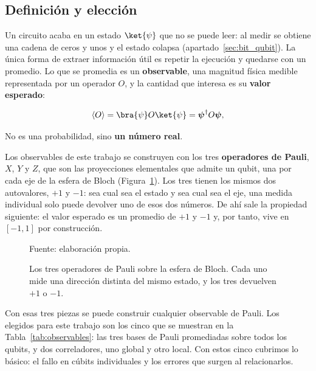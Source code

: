 \subsection{Definición y elección}
\label{sec:cinco_observables}

Un circuito acaba en un estado $\ket{\psi}$ que no se puede leer: al medir se obtiene una
cadena de ceros y unos y el estado colapsa (apartado~\ref{sec:bit_qubit}). La única forma de
extraer información útil es repetir la ejecución y quedarse con un promedio. Lo que se
promedia es un \textbf{observable}, una magnitud física medible representada por un operador
$O$, y la cantidad que interesa es su \textbf{valor esperado}:

\begin{equation}
\label{eq:valor_esperado}
\langle O \rangle = \bra{\psi} O \ket{\psi} = \boldsymbol{\psi}^\dagger O \boldsymbol{\psi} ,
\end{equation}

\noindent No es una probabilidad, sino \textbf{un número real}.

Los observables de este trabajo se construyen con los tres \textbf{operadores de Pauli}, $X$,
$Y$ y $Z$, que son las proyecciones elementales que admite un qubit, una por cada eje de la esfera
de Bloch (Figura~\ref{fig:pauli}). Los tres tienen los mismos dos autovalores, $+1$ y $-1$: sea
cual sea el estado y sea cual sea el eje, una medida individual solo puede devolver uno
de esos dos números. De ahí sale la propiedad siguiente: el
valor esperado es un promedio de $+1$ y $-1$ y, por tanto, vive en $[-1,1]$ por construcción.

\begin{figure}[htbp]
    \centering
    \caption{Los tres operadores de Pauli sobre la esfera de Bloch. Cada uno mide una
             dirección distinta del mismo estado, y los tres devuelven $+1$ o $-1$.}
    \label{fig:pauli}

    

    {\footnotesize Fuente: elaboración propia.}
\end{figure}

Con esas tres piezas se puede construir cualquier observable de Pauli. Los elegidos para este trabajo son los cinco que se muestran en la Tabla~\ref{tab:observables}: las tres bases de Pauli promediadas sobre todos
los qubits, y dos correladores, uno global y otro local. Con estos cinco cubrimos lo básico: el fallo en cúbits individuales y los errores que surgen al relacionarlos.

